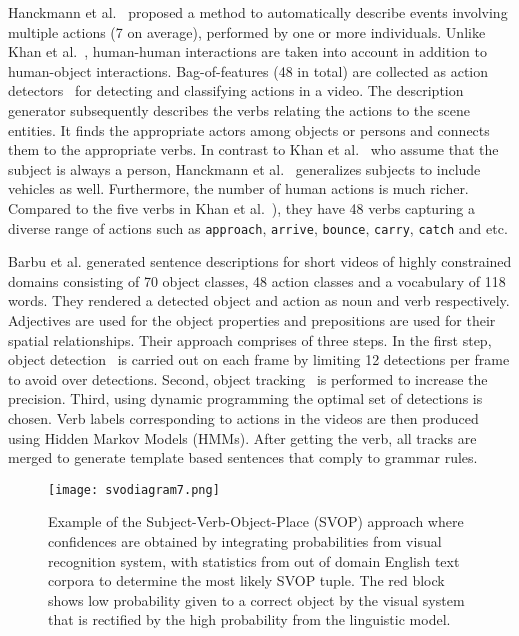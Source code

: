 \documentclass[10pt,journal,compsoc]{IEEEtran}
\begin{document}
Hanckmann et al.~\cite{hanckmann2012automated} proposed a method to automatically describe events involving multiple actions (7 on average), performed by one or more individuals. Unlike Khan et al.~\cite{khan2011human}, human-human interactions are taken into account in addition to human-object interactions. Bag-of-features (48 in total) are collected as action detectors~\cite{burghouts2012recognition} for detecting and classifying actions in a video. The description generator subsequently describes the verbs relating the actions to the scene entities. It finds the appropriate actors among objects or persons and connects them to the appropriate verbs. In contrast to Khan et al.~\cite{khan2011human} who assume that the subject is always a person, Hanckmann et al.~\cite{hanckmann2012automated} generalizes subjects to include vehicles as well. Furthermore, the number of human actions is much richer. Compared to the five verbs in Khan et al.~\cite{khan2011human}), they have 48 verbs capturing  a diverse range of actions such as \texttt{approach}, \texttt{arrive}, \texttt{bounce}, \texttt{carry}, \texttt{catch} and etc.

Barbu et al. \cite{barbu2012video} generated sentence descriptions for short videos of highly constrained domains consisting of 70 object classes, 48 action classes and a vocabulary of 118 words. They rendered a detected object and action as noun and verb respectively. Adjectives are used for the object properties and prepositions are used for their spatial relationships. Their approach comprises of three steps. In the first step, object detection~\cite{felzenszwalb2010b} is carried out on each frame by limiting 12 detections per frame to avoid over detections. Second, object tracking~\cite{tomasi1991detection, shi1994good} is performed to increase the precision. Third, using dynamic programming the optimal set of detections is chosen. Verb labels corresponding to actions in the videos are then produced using Hidden Markov Models (HMMs). After getting the verb, all tracks are merged to generate template based sentences that comply to grammar rules. 

\begin{figure*}[htbp]
   \centering
   \texttt{[image: svodiagram7.png]} 
   \vspace{-3mm}
   \caption{Example of the Subject-Verb-Object-Place (SVOP) \cite{thomason2014integrating} approach where confidences are obtained by integrating probabilities from visual recognition system, with statistics from out of domain English text corpora to determine the most likely SVOP tuple. The red block shows low probability given to a correct object by the visual system that is rectified by the high probability from the linguistic model.}
\label{fig:svoexample}
    \vspace{-5mm}
\end{figure*}
\end{document}

